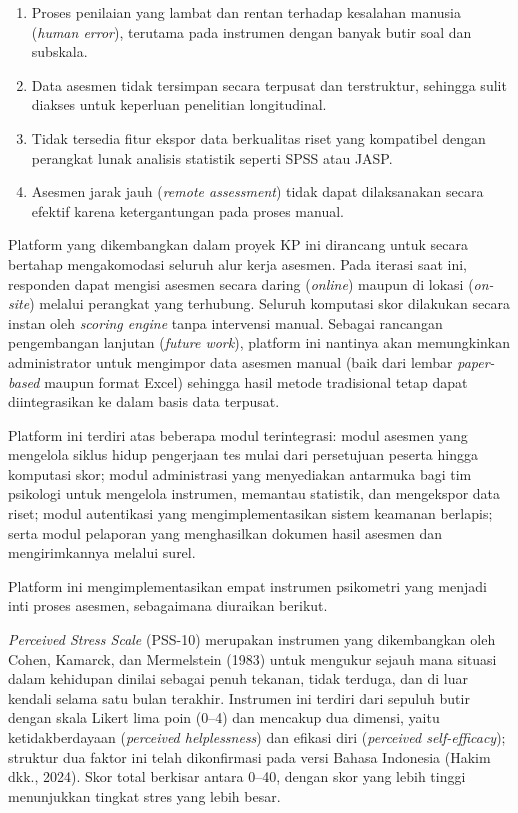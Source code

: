 \begin{enumerate}[leftmargin=2cm]
  \item Proses penilaian yang lambat dan rentan terhadap kesalahan manusia (\textit{human error}), terutama pada instrumen dengan banyak butir soal dan subskala.
  \item Data asesmen tidak tersimpan secara terpusat dan terstruktur, sehingga sulit diakses untuk keperluan penelitian longitudinal.
  \item Tidak tersedia fitur ekspor data berkualitas riset yang kompatibel dengan perangkat lunak analisis statistik seperti SPSS atau JASP.
  \item Asesmen jarak jauh (\textit{remote assessment}) tidak dapat dilaksanakan secara efektif karena ketergantungan pada proses manual.
\end{enumerate}

Platform yang dikembangkan dalam proyek KP ini dirancang untuk secara bertahap mengakomodasi seluruh alur kerja asesmen. Pada iterasi saat ini, responden dapat mengisi asesmen secara daring (\textit{online}) maupun di lokasi (\textit{on-site}) melalui perangkat yang terhubung. Seluruh komputasi skor dilakukan secara instan oleh \textit{scoring engine} tanpa intervensi manual. Sebagai rancangan pengembangan lanjutan (\textit{future work}), platform ini nantinya akan memungkinkan administrator untuk mengimpor data asesmen manual (baik dari lembar \textit{paper-based} maupun format Excel) sehingga hasil metode tradisional tetap dapat diintegrasikan ke dalam basis data terpusat.

Platform ini terdiri atas beberapa modul terintegrasi: modul asesmen yang mengelola siklus hidup pengerjaan tes mulai dari persetujuan peserta hingga komputasi skor; modul administrasi yang menyediakan antarmuka bagi tim psikologi untuk mengelola instrumen, memantau statistik, dan mengekspor data riset; modul autentikasi yang mengimplementasikan sistem keamanan berlapis; serta modul pelaporan yang menghasilkan dokumen hasil asesmen dan mengirimkannya melalui surel.

Platform ini mengimplementasikan empat instrumen psikometri yang menjadi inti proses asesmen, sebagaimana diuraikan berikut.

\textit{Perceived Stress Scale} (PSS-10) merupakan instrumen yang dikembangkan oleh Cohen, Kamarck, dan Mermelstein (1983) untuk mengukur sejauh mana situasi dalam kehidupan dinilai sebagai penuh tekanan, tidak terduga, dan di luar kendali selama satu bulan terakhir. Instrumen ini terdiri dari sepuluh butir dengan skala Likert lima poin (0--4) dan mencakup dua dimensi, yaitu ketidakberdayaan (\textit{perceived helplessness}) dan efikasi diri (\textit{perceived self-efficacy}); struktur dua faktor ini telah dikonfirmasi pada versi Bahasa Indonesia (Hakim dkk., 2024). Skor total berkisar antara 0--40, dengan skor yang lebih tinggi menunjukkan tingkat stres yang lebih besar.


